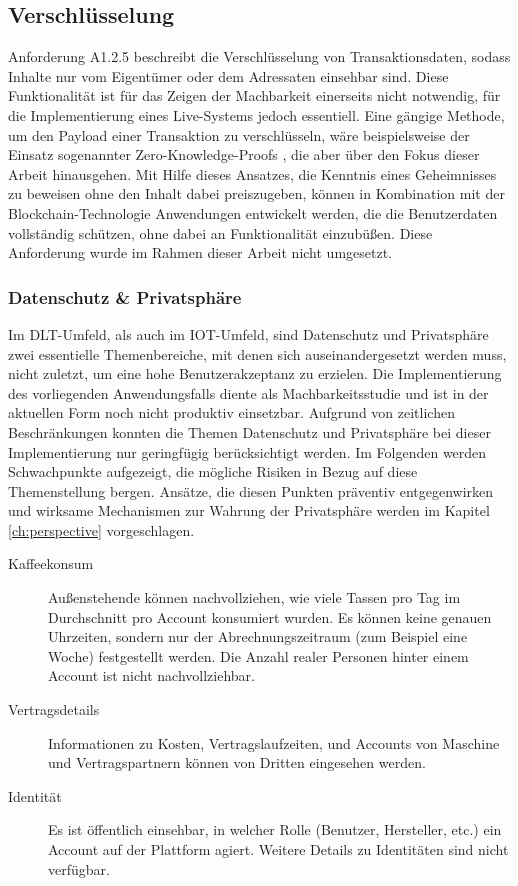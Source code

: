 \subsection{Verschlüsselung}
\label{subsec:implementation:requirements:encryption}
Anforderung A1.2.5 beschreibt die Verschlüsselung von Transaktionsdaten, sodass Inhalte nur vom Eigentümer oder dem Adressaten einsehbar sind. Diese Funktionalität ist für das Zeigen der Machbarkeit einerseits nicht notwendig, für die Implementierung eines Live-Systems jedoch essentiell. Eine gängige Methode, um den Payload einer Transaktion zu verschlüsseln, wäre beispielsweise der Einsatz sogenannter Zero-Knowledge-Proofs \cite{zeroknowledge2020}, die aber über den Fokus dieser Arbeit hinausgehen. Mit Hilfe dieses Ansatzes, die Kenntnis eines Geheimnisses zu beweisen ohne den Inhalt dabei preiszugeben, können in Kombination mit der Blockchain-Technologie Anwendungen entwickelt werden, die die Benutzerdaten vollständig schützen, ohne dabei an Funktionalität einzubüßen. Diese Anforderung wurde im Rahmen dieser Arbeit nicht umgesetzt.\\

\subsubsection{Datenschutz \& Privatsphäre}
\label{subsub:implementation:requirements:encryption:privacy}
Im \ac{DLT}-Umfeld, als auch im \ac{IOT}-Umfeld, sind Datenschutz und Privatsphäre zwei essentielle Themenbereiche, mit denen sich auseinandergesetzt werden muss, nicht zuletzt, um eine hohe Benutzerakzeptanz zu erzielen. Die Implementierung des vorliegenden Anwendungsfalls diente als Machbarkeitsstudie und ist in der aktuellen Form noch nicht produktiv einsetzbar. Aufgrund von zeitlichen Beschränkungen konnten die Themen Datenschutz und Privatsphäre bei dieser Implementierung nur geringfügig berücksichtigt werden. Im Folgenden werden Schwachpunkte aufgezeigt, die mögliche Risiken in Bezug auf diese Themenstellung bergen. Ansätze, die diesen Punkten präventiv entgegenwirken und wirksame Mechanismen zur Wahrung der Privatsphäre werden im Kapitel \ref{ch:perspective} vorgeschlagen.\\
\begin{description}
  \item[Kaffeekonsum] Außenstehende können nachvollziehen, wie viele Tassen pro Tag im Durchschnitt pro Account konsumiert wurden. Es können keine genauen Uhrzeiten, sondern nur der Abrechnungszeitraum (zum Beispiel eine Woche) festgestellt werden. Die Anzahl realer Personen hinter einem Account ist nicht nachvollziehbar.
  \item[Vertragsdetails] Informationen zu Kosten, Vertragslaufzeiten, und Accounts von Maschine und Vertragspartnern können von Dritten eingesehen werden.
  \item[Identität] Es ist öffentlich einsehbar, in welcher Rolle (Benutzer, Hersteller, etc.) ein Account auf der Plattform agiert. Weitere Details zu Identitäten sind nicht verfügbar.
\end{description}

